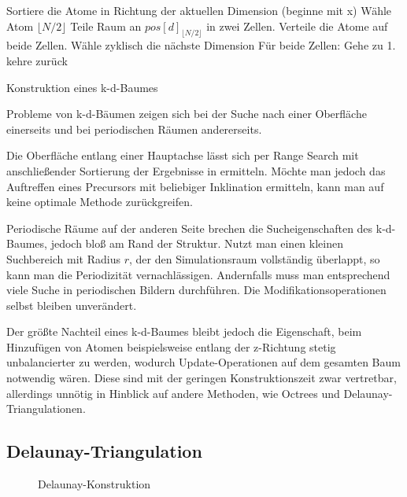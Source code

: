 \begin{algorithm}
  \begin{algorithmic}
    \STATE Sortiere die Atome in Richtung der aktuellen Dimension (beginne mit x)
    \STATE Wähle Atom $\lfloor N/2 \rfloor$
    \STATE Teile Raum an $pos[d]_{\lfloor N/2 \rfloor}$ in zwei Zellen. Verteile die Atome auf beide Zellen.
    \STATE Wähle zyklisch die nächste Dimension
    \STATE Für beide Zellen: Gehe zu 1.
    \STATE kehre zurück
    \ENDIF
  \end{algorithmic}
  \caption[Konstruktion eines k-d-Baumes]{Konstruktion eines k-d-Baumes}
  \label{algo:kdtree-construction}
\end{algorithm}

Probleme von k-d-Bäumen zeigen sich bei der Suche nach einer Oberfläche einerseits und bei periodischen Räumen andererseits.

Die Oberfläche entlang einer Hauptachse lässt sich per Range Search mit anschließender Sortierung der Ergebnisse in  ermitteln.
Möchte man jedoch das Auftreffen eines Precursors mit beliebiger Inklination ermitteln, kann man auf keine optimale Methode zurückgreifen.

Periodische Räume auf der anderen Seite brechen die Sucheigenschaften des k-d-Baumes, jedoch bloß am Rand der Struktur.
Nutzt man einen kleinen Suchbereich mit Radius $r$, der den Simulationsraum vollständig überlappt, so kann man die Periodizität vernachlässigen.
Andernfalls muss man entsprechend viele Suche in periodischen Bildern durchführen.
Die Modifikationsoperationen selbst bleiben unverändert.

Der größte Nachteil eines k-d-Baumes bleibt jedoch die Eigenschaft, beim Hinzufügen von Atomen beispielsweise entlang der z-Richtung stetig unbalancierter zu werden, wodurch Update-Operationen auf dem gesamten Baum notwendig wären.
Diese sind mit der geringen Konstruktionszeit zwar vertretbar, allerdings unnötig in Hinblick auf andere Methoden, wie Octrees und Delaunay-Triangulationen.

\subsection{Delaunay-Triangulation}

\CONTINUEHERE

\begin{figure}[bhpt]
  \centering
  \def\svgwidth{\textwidth}
  
  \caption[Delaunay-Konstruktion]{Delaunay-Konstruktion}
  \label{fig:delaunay}
\end{figure}

